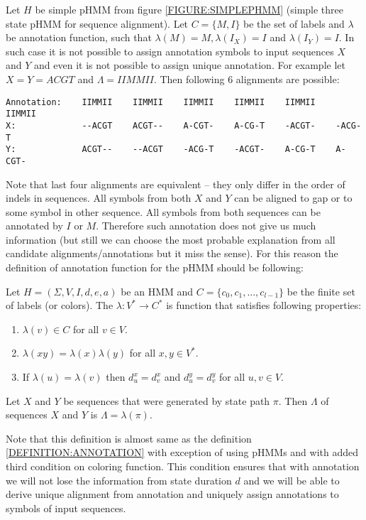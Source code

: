 Let $H$ be simple pHMM from figure \ref{FIGURE:SIMPLEPHMM} (simple three state
pHMM for sequence alignment). Let $C=\{M,I\}$ be the set of labels and 
$\lambda$ be annotation function, such that $\lambda(M)=M, \lambda(I_X)=I$ and
$\lambda(I_Y)=I$. In such case it is not possible to assign annotation symbols
to input sequences $X$ and $Y$ and even it is not possible to assign unique
annotation. For example let $X=Y=ACGT$ and $\Lambda = IIMMII$. Then
following $6$ alignments are possible:
\begin{verbatim}
Annotation:    IIMMII    IIMMII    IIMMII    IIMMII    IIMMII    IIMMII
X:             --ACGT    ACGT--    A-CGT-    A-CG-T    -ACGT-    -ACG-T
Y:             ACGT--    --ACGT    -ACG-T    -ACGT-    A-CG-T    A-CGT-
\end{verbatim}
Note that last four  alignments are equivalent -- they only differ in the order
of indels in sequences. All symbols from both $X$ and $Y$ can be aligned to gap
or to some symbol in other sequence. All symbols from both sequences can be
annotated by $I$ or $M$. Therefore such annotation does not give us much
information (but still we can choose the most probable explanation from all
candidate alignments/annotations but it miss the sense).
For this reason the definition of annotation function for the pHMM
should be following:

\begin{definition}
Let $H=(\Sigma,V,I,d,e,a)$ be an HMM and $C=\{c_0,c_1,\dots,c_{l-1}\}$ be the
finite set of labels (or colors). The 
$\lambda:V^*\to C^*$ is function that satisfies following properties: 
\begin{enumerate}
\item $\lambda(v)\in C$ for all $v\in V$.
\item $\lambda(xy) = \lambda(x)\lambda(y)$ for all $x,y\in V^*$.
\item If $\lambda(u)=\lambda(v)$ then $d^x_u=d^x_v$ and $d^y_u=d^y_v$ for all
$u,v\in V$.
\end{enumerate}
Let $X$ and $Y$ be sequences that were generated by state path $\pi$. Then
 $\Lambda$ of sequences $X$ and $Y$ is 
$\Lambda=\lambda(\pi)$.
\end{definition}

Note that this definition is almost same as the definition
\ref{DEFINITION:ANNOTATION} with exception of using pHMMs and with added 
third condition on coloring function. This condition ensures that with
annotation we will not lose the information from state duration $d$ and we will
be able to derive unique alignment from annotation and uniquely assign
annotations to symbols of input sequences.

